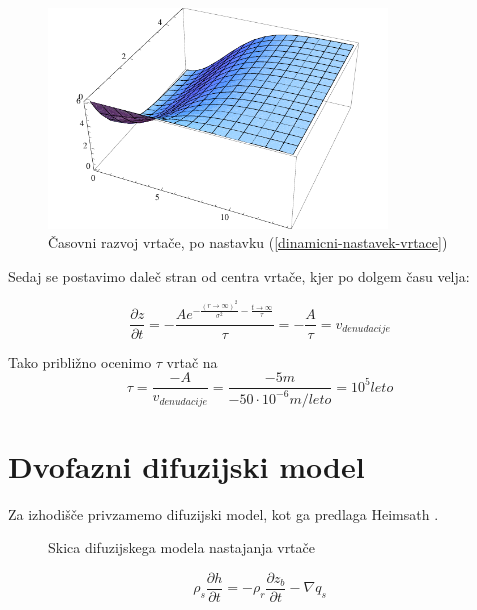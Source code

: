\documentclass[a4paper, oneside, 12pt]{book}
\begin{document}
\begin{figure}[H]
  \begin{center}
    \includegraphics[width=9cm]{slike/vrtaca-dinamicno}
  \end{center}
  \caption{Časovni razvoj vrtače, po nastavku (\ref{dinamicni-nastavek-vrtace})}
  \label{fig:vrtaca-dinamicno}
\end{figure}

Sedaj se postavimo daleč stran od centra vrtače, kjer po dolgem času velja:

\begin{equation}
  \frac{\partial z}{\partial t} = -\frac{A e^{-\frac{(r \rightarrow \infty)^2}{\sigma ^2}-\frac{t \rightarrow \infty}{\tau }}}{\tau } = -\frac{A}{\tau} = v_{denudacije}
  \label{hitrost-denudacije}
\end{equation}

Tako približno ocenimo $\tau$ vrtač na 
\begin{equation}
  \tau = \frac{-A}{v_{denudacije}}=\frac{-5m}{-50\cdot 10^{-6} m/leto} = 10^5 leto
  \label{tau-vrtace}
\end{equation}

\newpage

\section{Dvofazni difuzijski model}

Za izhodišče privzamemo difuzijski model, kot ga predlaga Heimsath \cite{Heimsath2001}.

\begin{figure}[H]
  \centering
  
  \caption{Skica difuzijskega modela nastajanja vrtače}
  \label{fig:difuzijski-model}
\end{figure}

\begin{equation}
  \rho_s \frac{\partial h}{\partial t} = -\rho_r \frac{\partial z_b}{\partial t} - \nabla q_s
  \label{kontinuitetna-enacba-original}
\end{equation}
\end{document}
